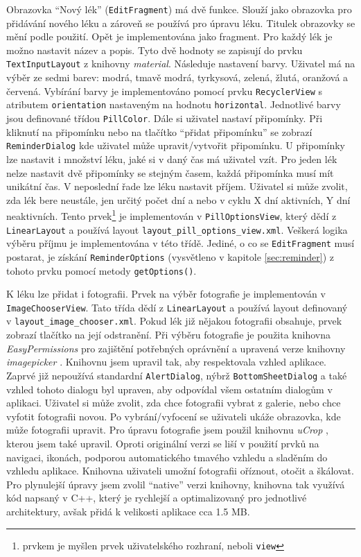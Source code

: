 \documentclass[../TakeYourPill.tex]{subfiles}
\begin{document}
Obrazovka \enquote{Nový lék} (\texttt{EditFragment}) má dvě funkce. Slouží jako obrazovka pro přidávání nového léku a zároveň se používá pro úpravu léku. Titulek obrazovky se mění podle použití. Opět je implementována jako fragment. Pro každý lék je možno nastavit název a popis. Tyto dvě hodnoty se zapisují do prvku \texttt{TextInputLayout} z knihovny \textit{material}. Následuje nastavení barvy. Uživatel má na výběr ze sedmi barev: modrá, tmavě modrá, tyrkysová, zelená, žlutá, oranžová a červená. Vybírání barvy je implementováno pomocí prvku \texttt{RecyclerView} s atributem \texttt{orientation} nastaveným na hodnotu \texttt{horizontal}. Jednotlivé barvy jsou definované třídou \texttt{PillColor}. Dále si uživatel nastaví připomínky. Při kliknutí na připomínku nebo na tlačítko \enquote{přidat připomínku} se zobrazí \texttt{ReminderDialog} kde uživatel může upravit/vytvořit připomínku. U připomínky lze nastavit i množství léku, jaké si v daný čas má uživatel vzít. Pro jeden lék nelze nastavit dvě připomínky se stejným časem, každá připomínka musí mít unikátní čas. V neposlední řade lze léku nastavit příjem. Uživatel si může zvolit, zda lék bere neustále, jen určitý počet dní a nebo v cyklu X dní aktivních, Y dní neaktivních. Tento prvek\footnote{prvkem je myšlen prvek uživatelského rozhraní, neboli \texttt{view}} je implementován v \texttt{PillOptionsView}, který dědí z \texttt{LinearLayout} a používá layout \texttt{layout\_pill\_options\_view.xml}. Veškerá logika výběru příjmu je implementována v této třídě. Jediné, o co se \texttt{EditFragment} musí postarat, je získání \texttt{ReminderOptions} (vysvětleno v kapitole \ref{sec:reminder}) z tohoto prvku pomocí metody \texttt{getOptions()}.

K léku lze přidat i fotografii. Prvek na výběr fotografie je implementován v \texttt{ImageChooserView}. Tato třída dědí z \texttt{LinearLayout} a používá layout definovaný v \texttt{layout\_image\_chooser.xml}. Pokud lék již nějakou fotografii obsahuje, prvek zobrazí tlačítko na její odstranění. Při výběru fotografie je použita knihovna \textit{EasyPermissions} \cite{easy-permissions} pro zajištění potřebných oprávnění a upravená verze knihovny \textit{imagepicker} \cite{imagepicker}. Knihovnu jsem upravil tak, aby respektovala vzhled aplikace. Zaprvé již nepoužívá standardní \texttt{AlertDialog}, nýbrž \texttt{BottomSheetDialog} a také vzhled tohoto dialogu byl upraven, aby odpovídal všem ostatním dialogům v aplikaci. Uživatel si může zvolit, zda chce fotografii vybrat z galerie, nebo chce vyfotit fotografii novou. Po vybrání/vyfocení se uživateli ukáže obrazovka, kde může fotografii upravit. Pro úpravu fotografie jsem použil knihovnu \textit{uCrop} \cite{ucrop}, kterou jsem také upravil. Oproti originální verzi se liší v použití prvků na navigaci, ikonách, podporou automatického tmavého vzhledu a sladěním do vzhledu aplikace. Knihovna uživateli umožní fotografii oříznout, otočit a škálovat. Pro plynulejší úpravy jsem zvolil \enquote{native} verzi knihovny, knihovna tak využívá kód napsaný v C++, který je rychlejší a optimalizovaný pro jednotlivé architektury, avšak přidá k velikosti aplikace cca 1.5 MB.
\end{document}
